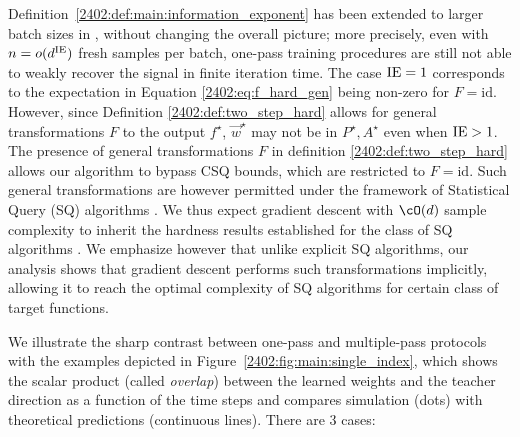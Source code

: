 Definition~\ref{2402:def:main:information_exponent} has been extended to larger batch sizes in \citep{abbe2022merged,dandi2023how}, without changing the overall picture; more precisely, even with $n = o(d^{\rm{IE}})$ fresh samples per batch, one-pass training procedures are still not able to weakly recover the signal in finite iteration time. The case $\rm IE=1$ corresponds to the expectation in Equation \ref{2402:eq:f_hard_gen} being non-zero for $F=\mathrm{id}$. However, since Definition \ref{2402:def:two_step_hard} allows for general transformations $F$ to the output $f^\star$, $\vec{w}^\star$ may not be in $P^\star, A^\star$ even when $\rm{IE} > 1$. The presence of general transformations $F$ in definition \ref{2402:def:two_step_hard} allows our algorithm to bypass CSQ bounds, which are restricted to $F=\mathrm{id}$. Such general transformations are however permitted under the framework of Statistical Query (SQ) algorithms \citep{kearns1998efficient}. We thus expect gradient descent with  $\cO(d)$ sample complexity to inherit the hardness results established for the class of SQ algorithms \citep{diakonikolas2020algorithms,goel2020superpolynomial,chen2021efficiently,chen2022hardness}.
We emphasize however that unlike explicit SQ algorithms, our analysis shows that gradient descent performs such transformations implicitly, allowing it to reach the optimal complexity of SQ algorithms for certain class of target functions.

We illustrate the sharp contrast between one-pass and multiple-pass protocols with the examples depicted in Figure~\ref{2402:fig:main:single_index}, which shows the scalar product (called \textit{overlap}) between the learned weights and the teacher direction as a function of the time steps and compares simulation (dots) with theoretical predictions (continuous lines). There are $3$ cases:

